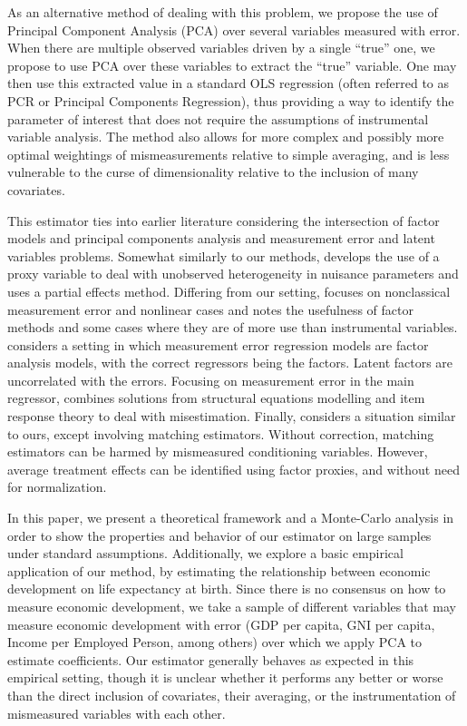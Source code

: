 \documentclass[10pt]{article}
\begin{document}
        As an alternative method of dealing with this problem, we propose the use of Principal Component Analysis (PCA) over several variables measured with error. When there are multiple observed variables driven by a single ``true'' one, we propose to use PCA over these variables to extract the ``true'' variable. One may then use this extracted value in a standard OLS regression (often referred to as PCR or Principal Components Regression), thus providing a way to identify the parameter of interest that does not require the assumptions of instrumental variable analysis. The method also allows for more complex and possibly more optimal weightings of mismeasurements relative to simple averaging, and is less vulnerable to the curse of dimensionality relative to the inclusion of many covariates.

        This estimator ties into earlier literature considering the intersection of factor models and principal components analysis and measurement error and latent variables problems. Somewhat similarly to our methods, \cite{nagasawa_identication_2020} develops the use of a proxy variable to deal with unobserved heterogeneity in nuisance parameters and uses a partial effects method. Differing from our setting, \cite{schennach_recent_2016} focuses on nonclassical measurement error and nonlinear cases and notes the usefulness of factor methods and some cases where they are of more use than instrumental variables. \cite{wegge_local_1996} considers a setting in which measurement error regression models are factor analysis models, with the correct regressors being the factors. Latent factors are uncorrelated with the errors. Focusing on measurement error in the main regressor, \cite{schofield_correcting_2015} combines solutions from structural equations modelling and item response theory to deal with misestimation. Finally, \cite{heckman_matching_2010} considers a situation similar to ours, except involving matching estimators. Without correction, matching estimators can be harmed by mismeasured conditioning variables. However, average treatment effects can be identified using factor proxies, and without need for normalization.

        In this paper, we present a theoretical framework and a Monte-Carlo analysis in order to show the properties and behavior of our estimator on large samples under standard assumptions. Additionally, we explore a basic empirical application of our method, by estimating the relationship between economic development on life expectancy at birth. Since there is no consensus on how to measure economic development, we take a sample of different variables that may measure economic development with error (GDP per capita, GNI per capita, Income per Employed Person, among others) over which we apply PCA to estimate coefficients. Our estimator generally behaves as expected in this empirical setting, though it is unclear whether it performs any better or worse than the direct inclusion of covariates, their averaging, or the instrumentation of mismeasured variables with each other.
\end{document}
